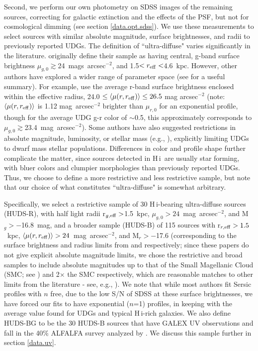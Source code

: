 \documentclass[twocolumn]{aastex6}
\newcommand{\hi}{H{\sc\,i}}
\begin{document}
Second, we perform our own photometry on SDSS images  of the remaining sources, correcting for galactic extinction and the effects of the PSF, but not for cosmological dimming (see section \ref{data.opt.sdss}). We use these measurements to select  sources with similar absolute magnitude, surface brightnesses, and radii to previously reported UDGs. 
The definition of ``ultra-diffuse" varies significantly in the literature. \cite{vandokkum15a} originally define their sample as having central, g-band surface brightness $\mu_{g,0}\gtrsim$24~mags~arcsec$^{-2}$, and 1.5$<r_{\rm eff}<$4.6~kpc. %
However, other authors have explored a wider range of parameter space (see \citealp{yagi16a} for a useful summary). For example, \cite{vanderburg16a} use the average r-band surface brightness enclosed within the effective radius,  24.0 $ \le \left< \mu(r,r_{\rm eff}) \right> \le 26.5$ mag arcsec$^{-2}$ (note: $\left< \mu(r,r_{\rm eff}) \right>$ is 1.12 mag~arcsec$^{-2}$ brighter than $\mu_{r,0}$  for an exponential profile, though for the average UDG g-r color of $\sim$0.5, this approximately corresponds to $\mu_{g,0}\gtrsim$23.4~mag~arcsec$^{-2}$). Some authors have also suggested restrictions in absolute magnitude, luminosity, or stellar mass (e.g., \citealp{mihos15a}), explicitly limiting UDGs to dwarf mass stellar populations. Differences in color and profile shape further complicate the matter, since
sources detected in \hi\ are usually star forming, with bluer colors and clumpier morphologies than previously reported UDGs. 
Thus, we choose to define a more restrictive and less restrictive sample, but note that our choice of what constitutes ``ultra-diffuse" is somewhat arbitrary. 

 Specifically, we select a restrictive sample of 30 \hi-bearing ultra-diffuse sources (HUDS-R), with half light radii r$_{g,{\rm eff}}>$1.5~kpc, $\mu_{g,0}>24$~mag~arcsec$^{-2}$, and M$_g>-$16.8~mag, and a broader sample (HUDS-B) of 115 sources with r$_{r,{\rm eff}}>1.5$~kpc, $\left< \mu(r,r_{\rm eff}) \right> >24$~mag~arcsec$^{-2}$, and M$_r>-$17.6 (corresponding to the surface brightness and radius limits from \citealp{vandokkum15a} and \citealp{vanderburg16a} respectively; since these papers do not give explicit absolute magnitude limits, we chose the restrictive and broad samples to include absolute magnitudes up to that of the Small Magellanic Cloud (SMC; see \citealp{mcconnachie12a}) and 2$\times$ the SMC respectively, which are reasonable matches to other limits from the literature - see, e.g., \citealp{yagi16a}). We note that while most authors fit Sersic profiles with $n$ free, due to the low S/N of SDSS at these surface brightnesses, we have forced our fits to have exponential ($n$=1) profiles, in keeping with the average value found for UDGs %
 and typical \hi-rich galaxies.\footnotemark[1] %
We also define HUDS-BG to be the 30 HUDS-B sources that have GALEX UV observations and fall in the 40\% ALFALFA survey analyzed by \cite{huang12b}. We discuss this sample further in section \ref{data.uv}.
\end{document}
